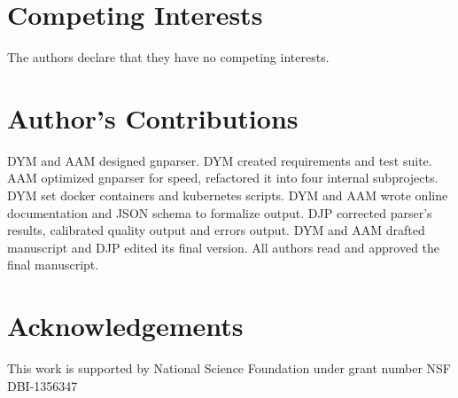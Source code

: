 \documentclass{bmcart}
\begin{document}
\section*{Competing Interests}

The authors declare that they have no competing interests.

\section*{Author's Contributions}

DYM and AAM designed gnparser. DYM created requirements and test suite. AAM
optimized gnparser for speed, refactored it into four internal subprojects.
DYM set docker containers and kubernetes scripts. DYM and AAM wrote online
documentation and JSON schema to formalize output. DJP corrected parser's
results, calibrated quality output and errors output. DYM and AAM drafted
manuscript and DJP edited its final version. All authors read and approved the
final manuscript.

\section*{Acknowledgements}

This work is supported by National Science Foundation under grant number NSF
DBI-1356347


\end{document}
